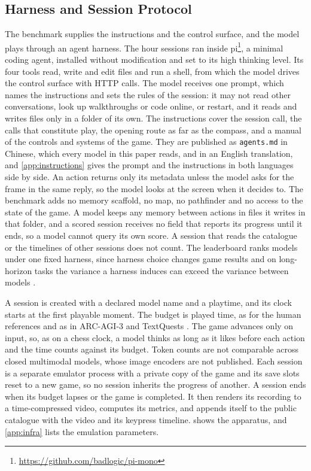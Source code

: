 \documentclass{article} %
\begin{document}
\subsection{Harness and Session Protocol}
\label{sec:protocol}

The benchmark supplies the instructions and the control surface, and the model plays through an agent harness. The hour sessions ran inside pi\footnote{\url{https://github.com/badlogic/pi-mono}}, a minimal coding agent, installed without modification and set to its high thinking level. Its four tools read, write and edit files and run a shell, from which the model drives the control surface with HTTP calls. The model receives one prompt, which names the instructions and sets the rules of the session: it may not read other conversations, look up walkthroughs or code online, or restart, and it reads and writes files only in a folder of its own. The instructions cover the session call, the calls that constitute play, the opening route as far as the compass, and a manual of the controls and systems of the game. They are published as \texttt{agents.md} in Chinese, which every model in this paper reads, and in an English translation, and \cref{app:instructions} gives the prompt and the instructions in both languages side by side. An action returns only its metadata unless the model asks for the frame in the same reply, so the model looks at the screen when it decides to. The benchmark adds no memory scaffold, no map, no pathfinder and no access to the state of the game. A model keeps any memory between actions in files it writes in that folder, and a scored session receives no field that reports its progress until it ends, so a model cannot query its own score. A session that reads the catalogue or the timelines of other sessions does not count. The leaderboard ranks models under one fixed harness, since harness choice changes game results \citep{hu2026lmgame,karten2026harness} and on long-horizon tasks the variance a harness induces can exceed the variance between models \citep{zhang2026harness}.

A session is created with a declared model name and a playtime, and its
clock starts at the first playable moment. The budget is played time, as for the human references and as in ARC-AGI-3 and TextQuests \citep{arc2026arcagi3,phan2025textquests}. The game advances only on input, so, as on a chess clock, a model thinks as long as it likes before each action and the time counts against its budget. Token counts are not comparable across closed multimodal models, whose image encoders are not published. Each session is a separate emulator process with a private copy of the game and its save slots reset to a new game, so no session inherits the progress of another. A session ends when its budget lapses or the game is completed. It then renders its recording to a time-compressed
video, computes its metrics, and appends itself to the public catalogue with the video and its keypress timeline.  shows the apparatus, and \cref{app:infra} lists the emulation parameters.
\end{document}
